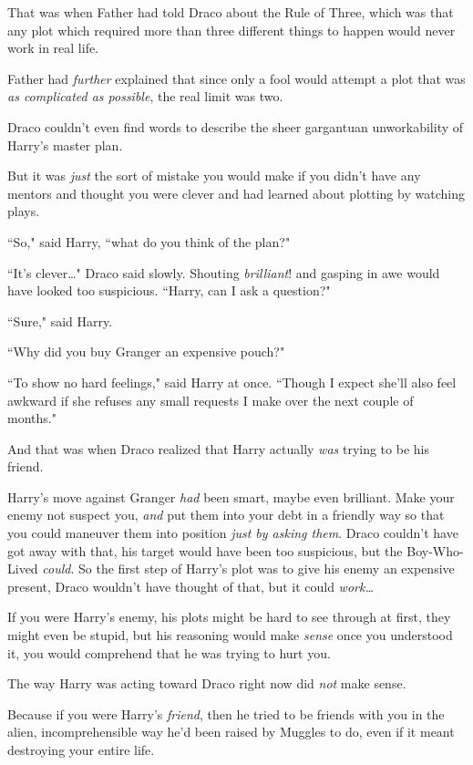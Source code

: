 That was when Father had told Draco about the Rule of Three, which was that any plot which required more than three different things to happen would never work in real life.

Father had \emph{further} explained that since only a fool would attempt a plot that was \emph{as complicated as possible}, the real limit was two.

Draco couldn't even find words to describe the sheer gargantuan unworkability of Harry's master plan.

But it was \emph{just} the sort of mistake you would make if you didn't have any mentors and thought you were clever and had learned about plotting by watching plays.

``So," said Harry, ``what do you think of the plan?"

``It's clever{\ldots}" Draco said slowly. Shouting \emph{brilliant}! and gasping in awe would have looked too suspicious. ``Harry, can I ask a question?"

``Sure," said Harry.

``Why did you buy Granger an expensive pouch?"

``To show no hard feelings," said Harry at once. ``Though I expect she'll also feel awkward if she refuses any small requests I make over the next couple of months."

And that was when Draco realized that Harry actually \emph{was} trying to be his friend.

Harry's move against Granger \emph{had} been smart, maybe even brilliant. Make your enemy not suspect you, \emph{and} put them into your debt in a friendly way so that you could maneuver them into position \emph{just by asking them}. Draco couldn't have got away with that, his target would have been too suspicious, but the Boy-Who-Lived \emph{could}. So the first step of Harry's plot was to give his enemy an expensive present, Draco wouldn't have thought of that, but it could \emph{work{\ldots}}

If you were Harry's enemy, his plots might be hard to see through at first, they might even be stupid, but his reasoning would make \emph{sense} once you understood it, you would comprehend that he was trying to hurt you.

The way Harry was acting toward Draco right now did \emph{not} make sense.

Because if you were Harry's \emph{friend}, then he tried to be friends with you in the alien, incomprehensible way he'd been raised by Muggles to do, even if it meant destroying your entire life.

